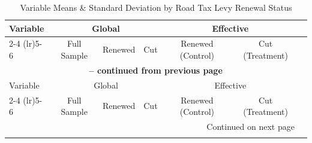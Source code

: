 \begin{longtable}{p{4cm}cccccc}
    \caption{Variable Means \& Standard Deviation by Road Tax Levy Renewal Status} \label{tab:variable_means_sd} \\
    \hline
    Variable & \multicolumn{3}{c}{Global} & \multicolumn{2}{c}{Effective} \\
    \cmidrule(lr){2-4} \cmidrule(lr){5-6}
    & Full Sample & Renewed & Cut & Renewed (Control) & Cut (Treatment) \\
    \hline
    \endfirsthead

    \multicolumn{6}{c}{{\bfseries \tablename\ \thetable{} -- continued from previous page}} \\
    \hline
    Variable & \multicolumn{3}{c}{Global} & \multicolumn{2}{c}{Effective} \\
    \cmidrule(lr){2-4} \cmidrule(lr){5-6}
    & Full Sample & Renewed & Cut & Renewed (Control) & Cut (Treatment) \\
    \hline
    \endhead

    \hline \multicolumn{6}{r}{{Continued on next page}} \\
    \endfoot

    \hline
    \endlastfoot


\end{longtable}
